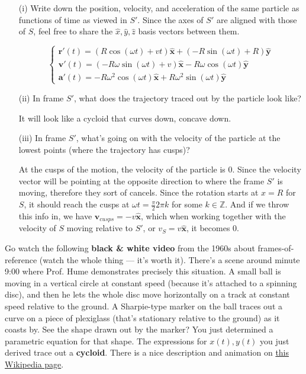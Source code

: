 \documentclass[12pt]{article}
\newcommand{\Z}{\mathbb{Z}}
\newcommand{\paren}[1]{\left( #1 \right)}
\newcommand{\unx}{\hat{\mathbf{x}}}
\newcommand{\uny}{\hat{\mathbf{y}}}
\begin{document}
\begin{enumerate}
    \item[(i)] Write down the position, velocity, and acceleration of the same particle as functions of time as viewed in \(S'\). Since the axes of \(S'\) are aligned with those of \(S\), feel free to share the \(\hat{x}, \hat{y}, \hat{z}\) basis vectors between them.

    \[
    \begin{cases}
        \mathbf{r'}(t) = \paren{R\cos\paren{\omega t} + vt}\unx + \paren{-R\sin\paren{\omega t} + R}\uny\\
        \mathbf{v'}(t) = \paren{-R\omega\sin\paren{\omega t}+ v}\unx  -R\omega\cos\paren{\omega t}\uny\\
        \mathbf{a'}(t)  = -R\omega^2\cos(\omega t) \unx + R\omega^2\sin(\omega t)\uny
    \end{cases}
    \]

    
    
    \item[(ii)] In frame \(S'\), what does the trajectory traced out by the particle look like?

    It will look like a cycloid that curves down, concave down. 



    \item[(iii)] In frame \(S'\), what’s going on with the velocity of the particle at the lowest points (where the trajectory has cusps)?

    At the cusps of the motion, the velocity of the particle is 0. Since the velocity vector will be pointing at the opposite direction to where the frame $S'$ is moving, therefore they sort of cancels. Since the rotation starts at $x=R$ for $S$, it should reach the cusps at $\omega t= \frac{\pi}{2} 2\pi k$ for some $k \in \Z$. And if we throw this info in, we have $\mathbf{v}_{cusps} = -v \unx$, which when working together with the velocity of $S$ moving relative to $S'$, or $v_S = v\unx$, it becomes 0. 
\end{enumerate}

Go watch the following \textbf{black \& white video} from the 1960s about frames-of-reference (watch the whole thing — it’s worth it). There’s a scene around minute 9:00 where Prof. Hume demonstrates precisely this situation. A small ball is moving in a vertical circle at constant speed (because it’s attached to a spinning disc), and then he lets the whole disc move horizontally on a track at constant speed relative to the ground. A Sharpie-type marker on the ball traces out a curve on a piece of plexiglass (that’s stationary relative to the ground) as it coasts by. See the shape drawn out by the marker? You just determined a parametric equation for that shape. The expressions for \( x(t), y(t) \) you just derived trace out a \textbf{cycloid}. There is a nice description and animation on \href{https://en.wikipedia.org/wiki/Cycloid}{this Wikipedia page}.
\end{document}
